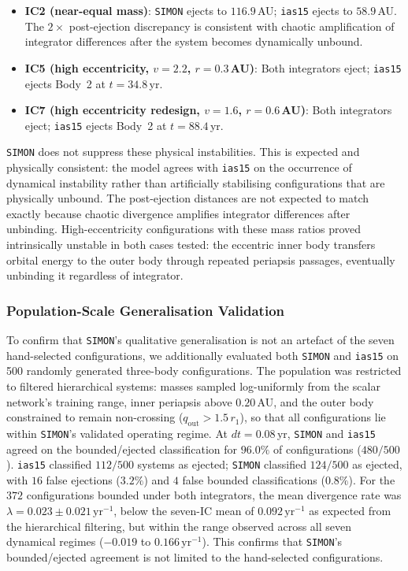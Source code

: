\documentclass[12pt]{article}
\begin{document}
\begin{itemize}
  \item \textbf{IC2 (near-equal mass)}: \texttt{SIMON} ejects to $116.9$\,AU;
        \texttt{ias15} ejects to $58.9$\,AU. The $2\times$ post-ejection discrepancy
        is consistent with chaotic amplification of integrator differences after the
        system becomes dynamically unbound.
  \item \textbf{IC5 (high eccentricity, $v = 2.2$, $r = 0.3$\,AU)}: Both
        integrators eject; \texttt{ias15} ejects Body~2 at $t = 34.8$\,yr.
  \item \textbf{IC7 (high eccentricity redesign, $v = 1.6$, $r = 0.6$\,AU)}:
        Both integrators eject; \texttt{ias15} ejects Body~2 at $t = 88.4$\,yr.
\end{itemize}

\texttt{SIMON} does not suppress these physical instabilities. This is expected and physically consistent: the model agrees with \texttt{ias15} on the occurrence of dynamical instability rather than artificially stabilising configurations that
are physically unbound. The post-ejection distances are not expected to match exactly
because chaotic divergence amplifies integrator differences after unbinding. High-eccentricity
configurations with these mass ratios proved intrinsically unstable in both cases
tested: the eccentric inner body transfers orbital energy to the outer body through
repeated periapsis passages, eventually unbinding it regardless of integrator.

\subsubsection{Population-Scale Generalisation Validation}
\label{sec:population}

To confirm that \texttt{SIMON}'s qualitative generalisation is not an
artefact of the seven hand-selected configurations, we additionally
evaluated both \texttt{SIMON} and \texttt{ias15} on 500 randomly
generated three-body configurations. The population was restricted to
filtered hierarchical systems: masses sampled log-uniformly from the
scalar network's training range, inner periapsis above $0.20$\,AU, and
the outer body constrained to remain non-crossing ($q_{\mathrm{out}}
> 1.5\,r_1$), so that all configurations lie within
\texttt{SIMON}'s validated operating regime.
At $dt = 0.08$\,yr, \texttt{SIMON} and \texttt{ias15} agreed on the
bounded/ejected classification for $96.0\%$ of configurations
($480/500$). \texttt{ias15} classified $112/500$ systems as ejected;
\texttt{SIMON} classified $124/500$ as ejected, with $16$ false
ejections ($3.2\%$) and $4$ false bounded classifications ($0.8\%$).
For the $372$ configurations bounded under both integrators, the mean
divergence rate was $\lambda = 0.023 \pm 0.021\,\mathrm{yr}^{-1}$,
below the seven-IC mean of $0.092\,\mathrm{yr}^{-1}$ as expected from
the hierarchical filtering, but within the range observed across all
seven dynamical regimes ($-0.019$ to $0.166\,\mathrm{yr}^{-1}$).
This confirms that \texttt{SIMON}'s bounded/ejected agreement is not
limited to the hand-selected configurations.
\end{document}
